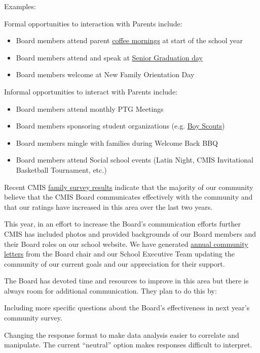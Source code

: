 \begin{findings}
Examples:

Formal opportunities to interaction with Parents include:
\begin{itemize}
\item Board members attend parent \href{https://drive.google.com/a/cmis.ac.th/file/d/0Bwny3HLdIIS7d1FGeDhaZE1EcG1PMHlMX2NRZTdIYXlWZERB/view?usp=sharing}{coffee mornings} at start of the school year
\item Board members attend and speak at \href{https://drive.google.com/a/cmis.ac.th/file/d/0Bwny3HLdIIS7NGpoVEtlWmw2RE0/view?usp=sharing}{Senior Graduation day}
\item Board members welcome at New Family Orientation Day
\end{itemize}

Informal opportunities to interact with Parents include:
\begin{itemize}
\item Board members attend monthly PTG Meetings
\item Board members sponsoring student organizations (e.g. \href{https://drive.google.com/a/cmis.ac.th/file/d/0Bwny3HLdIIS7WXpial9KYjFlWFBBQW1YQ2thOVpsTTFCeGVr/view?usp=sharing}{Boy Scouts})
\item Board members mingle with families during Welcome Back BBQ
\item Board members attend Social school events (Latin Night, CMIS Invitational Basketball Tournament, etc.)
\end{itemize}


Recent CMIS \href{https://docs.google.com/a/cmis.ac.th/document/d/1_otvw47y3Z-1CSjXnKhgRTauVRqPl1S6nSdmsb00O2k/edit?usp=sharing}{family survey results} indicate that the majority of our community believe that the CMIS Board communicates effectively with the community and that our ratings have increased in this area over the last two years.

This year, in an effort to increase the Board's communication efforts further CMIS has included photos and provided backgrounds of our Board members and their Board roles on our school website. We have generated \href{https://drive.google.com/a/cmis.ac.th/file/d/0Bwny3HLdIIS7MjJMX1ZIVS1zSXJOaTNZcFRmTWV1Q1VTc1hZ/view?usp=sharing}{annual community letters} from the Board chair and our School Executive Team updating the community of our current goals and our appreciation for their support.


The Board has devoted time and resources to improve in this area but there is always room for additional communication. They plan to do this by:

Including more specific questions about the Board’s effectiveness in next year’s community survey. 

Changing the response format to make data analysis easier to correlate and manipulate. The current ``neutral'' option makes responses difficult to interpret.
\end{findings}

